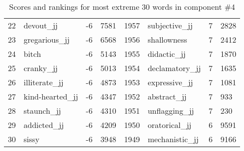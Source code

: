 \begin{table}[tbp]
\begin{tabular}{| rlr@{.}l | rlr@{.}l |}
    22 & devout\_jj & -6 & 7581    &    1957 & subjective\_jj & 7 & 2828 \\
    23 & gregarious\_jj & -6 & 6568    &    1956 & shallowness & 7 & 2412 \\
    24 & bitch & -6 & 5143    &    1955 & didactic\_jj & 7 & 1870 \\
    25 & cranky\_jj & -6 & 5013    &    1954 & declamatory\_jj & 7 & 1635 \\
    26 & illiterate\_jj & -6 & 4873    &    1953 & expressive\_jj & 7 & 1081 \\
    27 & kind-hearted\_jj & -6 & 4347    &    1952 & abstract\_jj & 7 & 933 \\
    28 & staunch\_jj & -6 & 4310    &    1951 & unflagging\_jj & 7 & 230 \\
    29 & addicted\_jj & -6 & 4209    &    1950 & oratorical\_jj & 6 & 9591 \\
    30 & sissy & -6 & 3948    &    1949 & mechanistic\_jj & 6 & 9166 \\
    \hline
    \end{tabular}
    \caption{Scores and rankings for most extreme 30 words in component \#4} 
\end{table}
\clearpage
